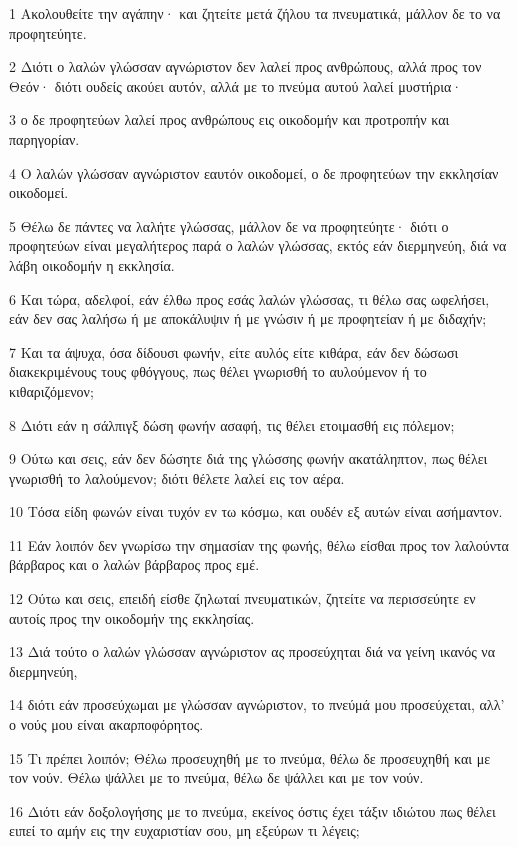 \par 1 Ακολουθείτε την αγάπην· και ζητείτε μετά ζήλου τα πνευματικά, μάλλον δε το να προφητεύητε.
\par 2 Διότι ο λαλών γλώσσαν αγνώριστον δεν λαλεί προς ανθρώπους, αλλά προς τον Θεόν· διότι ουδείς ακούει αυτόν, αλλά με το πνεύμα αυτού λαλεί μυστήρια·
\par 3 ο δε προφητεύων λαλεί προς ανθρώπους εις οικοδομήν και προτροπήν και παρηγορίαν.
\par 4 Ο λαλών γλώσσαν αγνώριστον εαυτόν οικοδομεί, ο δε προφητεύων την εκκλησίαν οικοδομεί.
\par 5 Θέλω δε πάντες να λαλήτε γλώσσας, μάλλον δε να προφητεύητε· διότι ο προφητεύων είναι μεγαλήτερος παρά ο λαλών γλώσσας, εκτός εάν διερμηνεύη, διά να λάβη οικοδομήν η εκκλησία.
\par 6 Και τώρα, αδελφοί, εάν έλθω προς εσάς λαλών γλώσσας, τι θέλω σας ωφελήσει, εάν δεν σας λαλήσω ή με αποκάλυψιν ή με γνώσιν ή με προφητείαν ή με διδαχήν;
\par 7 Και τα άψυχα, όσα δίδουσι φωνήν, είτε αυλός είτε κιθάρα, εάν δεν δώσωσι διακεκριμένους τους φθόγγους, πως θέλει γνωρισθή το αυλούμενον ή το κιθαριζόμενον;
\par 8 Διότι εάν η σάλπιγξ δώση φωνήν ασαφή, τις θέλει ετοιμασθή εις πόλεμον;
\par 9 Ούτω και σεις, εάν δεν δώσητε διά της γλώσσης φωνήν ακατάληπτον, πως θέλει γνωρισθή το λαλούμενον; διότι θέλετε λαλεί εις τον αέρα.
\par 10 Τόσα είδη φωνών είναι τυχόν εν τω κόσμω, και ουδέν εξ αυτών είναι ασήμαντον.
\par 11 Εάν λοιπόν δεν γνωρίσω την σημασίαν της φωνής, θέλω είσθαι προς τον λαλούντα βάρβαρος και ο λαλών βάρβαρος προς εμέ.
\par 12 Ούτω και σεις, επειδή είσθε ζηλωταί πνευματικών, ζητείτε να περισσεύητε εν αυτοίς προς την οικοδομήν της εκκλησίας.
\par 13 Διά τούτο ο λαλών γλώσσαν αγνώριστον ας προσεύχηται διά να γείνη ικανός να διερμηνεύη,
\par 14 διότι εάν προσεύχωμαι με γλώσσαν αγνώριστον, το πνεύμά μου προσεύχεται, αλλ' ο νούς μου είναι ακαρποφόρητος.
\par 15 Τι πρέπει λοιπόν; Θέλω προσευχηθή με το πνεύμα, θέλω δε προσευχηθή και με τον νούν. Θέλω ψάλλει με το πνεύμα, θέλω δε ψάλλει και με τον νούν.
\par 16 Διότι εάν δοξολογήσης με το πνεύμα, εκείνος όστις έχει τάξιν ιδιώτου πως θέλει ειπεί το αμήν εις την ευχαριστίαν σου, μη εξεύρων τι λέγεις;
